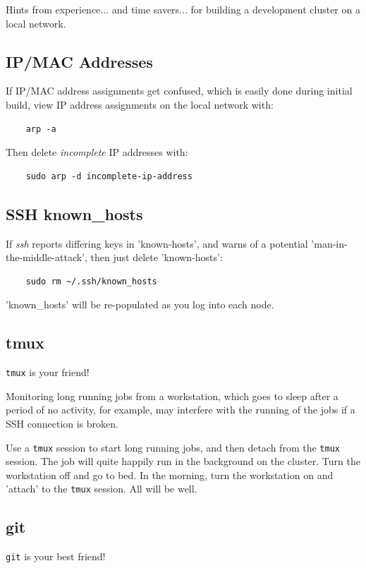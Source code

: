 \documentclass{article}
\begin{document}
Hints from experience... and time savers... for building a development cluster on a local network.

\subsection{IP/MAC Addresses}
If IP/MAC address assignments get confused, which is easily done during initial build, view IP address assignments on the local network with:

\begin{verbatim}
    arp -a
\end{verbatim}

Then delete \emph{incomplete} IP addresses with:

\begin{verbatim}
    sudo arp -d incomplete-ip-address
\end{verbatim}

\subsection{SSH known\_hosts}
If \emph{ssh} reports differing keys in 'known-hosts', and warns of a potential 'man-in-the-middle-attack', then just delete 'known-hosts':

\begin{verbatim}
    sudo rm ~/.ssh/known_hosts
\end{verbatim}

'known\_hosts' will be re-populated as you log into each node. 


\subsection{tmux}
\verb|tmux| is your friend!

Monitoring long running jobs from a workstation, which goes to sleep after a period of no activity, for example, may interfere with the running of the jobs if a SSH connection is broken.

Use a \verb|tmux| session to start long running jobs, and then detach from the \verb|tmux| session. The job will quite happily run in the background on the cluster. Turn the workstation off and go to bed. In the morning, turn the workstation on and 'attach' to the \verb|tmux| session. All will be well.

\subsection{git}
\verb|git| is your best friend!
\end{document}
